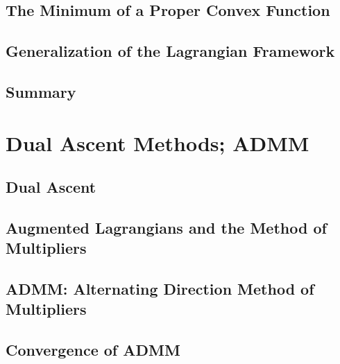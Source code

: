 \documentclass[a4paper]{article}
\begin{document}
\subsection{ The Minimum of a Proper Convex Function} %

\subsection{ Generalization of the Lagrangian Framework} %

\subsection{ Summary} %



\newpage
\section{Dual Ascent Methods; ADMM}
\subsection{ Dual Ascent} %

\subsection{ Augmented Lagrangians and the Method of Multipliers} %

\subsection{ ADMM: Alternating Direction Method of Multipliers} %

\subsection{ Convergence of ADMM} %
\end{document}

